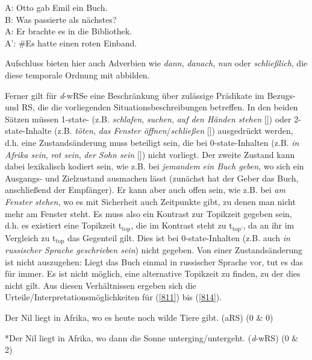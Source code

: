 \begin{exe}
	\ex\label{810} 
	A: Otto gab Emil ein Buch.\\
	B: Was passierte als nächstes?\\
	A: Er brachte es in die Bibliothek.\\
	A': \#Es hatte einen roten Einband.
\end{exe}
Aufschluss bieten hier auch Adverbien wie \textit{dann}, \textit{danach}, \textit{nun} oder \textit{schließlich}, die diese temporale Ordnung mit abbilden.

Ferner gilt für \textit{d}-wRSe eine Beschränkung über zulässige Prädikate im Bezugs- und RS, die die vorliegenden Situationsbeschreibungen betreffen. In den beiden Sätzen müssen  1-state- (z.B. \textit{schlafen}, \textit{suchen}, \textit{auf den Händen stehen} $[$\citealt[81-95]{Klein1994}$]$) oder  2-state-Inhalte (z.B. \textit{töten}, \textit{das Fenster öffnen}/\textit{schließen} $[$\citealt[81-95]{Klein1994}$]$) ausgedrückt werden, d.h. eine Zustandsänderung muss beteiligt sein, die bei  0-state-Inhalten (z.B. \textit{in Afrika sein}, \textit{rot sein}, \textit{der Sohn sein} $[$\citealt[81-95]{Klein1994}$]$) nicht vorliegt. Der zweite Zustand kann dabei lexikalisch kodiert sein, wie z.B. bei \textit{jemandem ein Buch geben}, wo sich ein Ausgangs- und Zielzustand ausmachen lässt (zunächst hat der Geber das Buch, anschließend der Empfänger). Er kann aber auch offen sein, wie z.B. bei \textit{am Fenster stehen}, wo es mit Sicherheit auch Zeitpunkte gibt, zu denen man nicht mehr am Fenster steht. Es muss also ein Kontrast zur Topikzeit gegeben sein, d.h. es existiert eine Topikzeit t$_{\textrm{top}}$, die im Kontrast steht zu t$_{\textrm{top'}}$, da an ihr im Vergleich zu t$_{\textrm{top}}$ das Gegenteil gilt. Dies ist bei 0-state-Inhalten (z.B. auch \textit{in russischer Sprache geschrieben sein}) nicht gegeben. Von einer Zustandsänderung ist nicht auszugehen: Liegt das Buch einmal in russischer Sprache vor, tut es das für immer. Es ist nicht möglich, eine alternative Topikzeit zu finden, zu der dies nicht gilt. Aus diesen Verhältnissen ergeben sich die Urteile/Interpretationsmöglichkeiten für (\ref{811}) bis (\ref{814}).

\begin{exe}
	\ex\label{811} 
	Der Nil liegt in Afrika, wo es heute noch wilde Tiere gibt. (aRS) (0 \& 0)
\end{exe}
\vspace{-0.65cm}
\begin{exe}
	\ex\label{812} 
	*Der Nil liegt in Afrika, wo dann die Sonne unterging/untergeht. (\textit{d}-wRS) (0 \& 2)
\end{exe}

